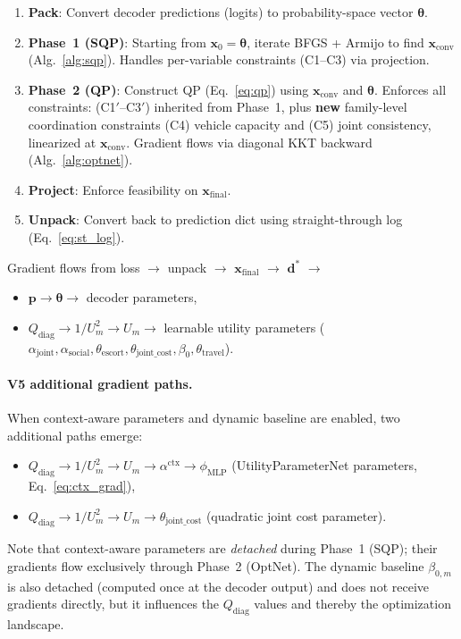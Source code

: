 \documentclass[11pt,a4paper]{article}
\newcommand{\xconv}{\mathbf{x}_{\mathrm{conv}}}
\newcommand{\xfinal}{\mathbf{x}_{\mathrm{final}}}
\newcommand{\thetapacked}{\boldsymbol{\theta}}
\begin{document}
\begin{enumerate}
    \item \textbf{Pack}: Convert decoder predictions (logits) to probability-space vector $\thetapacked$.
    \item \textbf{Phase~1 (SQP)}: Starting from $\mathbf{x}_0 = \thetapacked$, iterate BFGS + Armijo to find $\xconv$ (Alg.~\ref{alg:sqp}). Handles per-variable constraints (C1--C3) via projection.
    \item \textbf{Phase~2 (QP)}: Construct QP (Eq.~\ref{eq:qp}) using $\xconv$ and $\thetapacked$. Enforces all constraints: (C1$'$--C3$'$) inherited from Phase~1, plus \textbf{new} family-level coordination constraints (C4) vehicle capacity and (C5) joint consistency, linearized at $\xconv$. Gradient flows via diagonal KKT backward (Alg.~\ref{alg:optnet}).
    \item \textbf{Project}: Enforce feasibility on $\xfinal$.
    \item \textbf{Unpack}: Convert back to prediction dict using straight-through log (Eq.~\ref{eq:st_log}).
\end{enumerate}

Gradient flows from loss $\to$ unpack $\to$ $\xfinal$ $\to$ $\mathbf{d}^*$ $\to$
\begin{itemize}
    \item $\mathbf{p} \to \thetapacked \to$ decoder parameters,
    \item $Q_{\mathrm{diag}} \to 1/U_m^2 \to U_m \to$ learnable utility parameters ($\alpha_{\mathrm{joint}}, \alpha_{\mathrm{social}}, \theta_{\mathrm{escort}}, \theta_{\mathrm{joint\_cost}}, \beta_0, \theta_{\mathrm{travel}}$).
\end{itemize}

\paragraph{V5 additional gradient paths.}
When context-aware parameters and dynamic baseline are enabled, two additional paths emerge:
\begin{itemize}
    \item $Q_{\mathrm{diag}} \to 1/U_m^2 \to U_m \to \alpha^{\mathrm{ctx}} \to \phi_{\mathrm{MLP}}$ (UtilityParameterNet parameters, Eq.~\ref{eq:ctx_grad}),
    \item $Q_{\mathrm{diag}} \to 1/U_m^2 \to U_m \to \theta_{\mathrm{joint\_cost}}$ (quadratic joint cost parameter).
\end{itemize}
Note that context-aware parameters are \emph{detached} during Phase~1 (SQP); their gradients flow exclusively through Phase~2 (OptNet).
The dynamic baseline $\beta_{0,m}$ is also detached (computed once at the decoder output) and does not receive gradients directly, but it influences the $Q_{\mathrm{diag}}$ values and thereby the optimization landscape.
\end{document}
